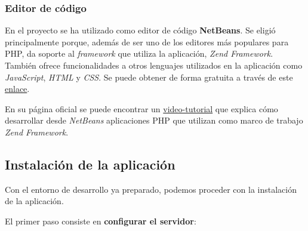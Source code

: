 \subsubsection{Editor de código}

En el proyecto se ha utilizado como editor de código \textbf{NetBeans}.
Se eligió principalmente porque, además de ser uno de los editores más
populares para PHP, da soporte al \emph{framework} que utiliza la
aplicación, \emph{Zend Framework}. También ofrece funcionalidades a
otros lenguajes utilizados en la aplicación como \emph{JavaScript},
\emph{HTML} y \emph{CSS}. Se puede obtener de forma gratuita a través de
este
\href{https://netbeans.org/community/releases/82/install.html}{enlace}.

En su página oficial se puede encontrar un
\href{https://netbeans.org/kb/docs/php/zend-framework-screencast.html}{video-tutorial}
que explica cómo desarrollar desde \emph{NetBeans} aplicaciones PHP que
utilizan como marco de trabajo \emph{Zend Framework}.


\subsection{Instalación de la aplicación}

Con el entorno de desarrollo ya preparado, podemos proceder con la
instalación de la aplicación.

El primer paso consiste en \textbf{configurar el servidor}:

